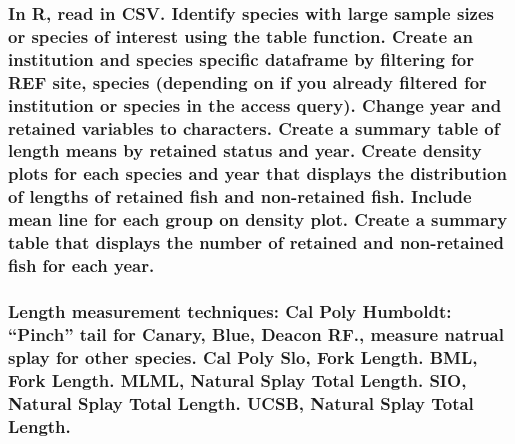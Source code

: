 \documentclass[
]{article}
\begin{document}
\hypertarget{in-r-read-in-csv.-identify-species-with-large-sample-sizes-or-species-of-interest-using-the-table-function.-create-an-institution-and-species-specific-dataframe-by-filtering-for-ref-site-species-depending-on-if-you-already-filtered-for-institution-or-species-in-the-access-query.-change-year-and-retained-variables-to-characters.-create-a-summary-table-of-length-means-by-retained-status-and-year.-create-density-plots-for-each-species-and-year-that-displays-the-distribution-of-lengths-of-retained-fish-and-non-retained-fish.-include-mean-line-for-each-group-on-density-plot.-create-a-summary-table-that-displays-the-number-of-retained-and-non-retained-fish-for-each-year.}{%
\subsubsection{In R, read in CSV. Identify species with large sample sizes or species of interest using the table function. Create an institution and species specific dataframe by filtering for REF site, species (depending on if you already filtered for institution or species in the access query). Change year and retained variables to characters. Create a summary table of length means by retained status and year. Create density plots for each species and year that displays the distribution of lengths of retained fish and non-retained fish. Include mean line for each group on density plot. Create a summary table that displays the number of retained and non-retained fish for each year.}\label{in-r-read-in-csv.-identify-species-with-large-sample-sizes-or-species-of-interest-using-the-table-function.-create-an-institution-and-species-specific-dataframe-by-filtering-for-ref-site-species-depending-on-if-you-already-filtered-for-institution-or-species-in-the-access-query.-change-year-and-retained-variables-to-characters.-create-a-summary-table-of-length-means-by-retained-status-and-year.-create-density-plots-for-each-species-and-year-that-displays-the-distribution-of-lengths-of-retained-fish-and-non-retained-fish.-include-mean-line-for-each-group-on-density-plot.-create-a-summary-table-that-displays-the-number-of-retained-and-non-retained-fish-for-each-year.}}

\hypertarget{length-measurement-techniques-cal-poly-humboldt-pinch-tail-for-canary-blue-deacon-rf.-measure-natrual-splay-for-other-species.-cal-poly-slo-fork-length.-bml-fork-length.-mlml-natural-splay-total-length.-sio-natural-splay-total-length.-ucsb-natural-splay-total-length.}{%
\subsubsection{Length measurement techniques: Cal Poly Humboldt: ``Pinch'' tail for Canary, Blue, Deacon RF., measure natrual splay for other species. Cal Poly Slo, Fork Length. BML, Fork Length. MLML, Natural Splay Total Length. SIO, Natural Splay Total Length. UCSB, Natural Splay Total Length.}\label{length-measurement-techniques-cal-poly-humboldt-pinch-tail-for-canary-blue-deacon-rf.-measure-natrual-splay-for-other-species.-cal-poly-slo-fork-length.-bml-fork-length.-mlml-natural-splay-total-length.-sio-natural-splay-total-length.-ucsb-natural-splay-total-length.}}
\end{document}
